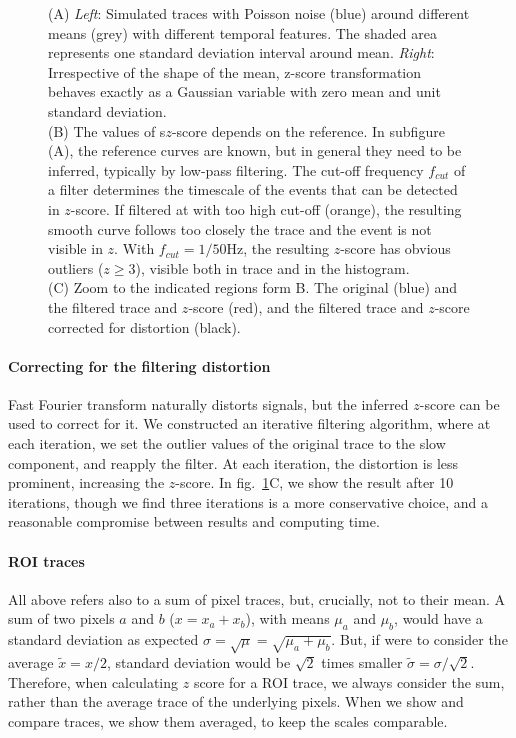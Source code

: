 \documentclass[a4paper,11pt,oneside]{article}
\begin{document}
\begin{figure}[t]
\begin{minipage}{.49\textwidth}
    \end{minipage}
    \caption{
    (A) \emph{Left}: Simulated traces with Poisson noise (blue) around different means (grey) with different temporal features. The shaded area represents one standard deviation interval around mean. 
    \emph{Right}: Irrespective of the shape of the mean, z-score transformation behaves exactly as a Gaussian variable with zero mean and unit standard deviation.\\
    (B) The values of s$z$-score depends on the reference. In subfigure (A), the reference curves are known, but in general they need to be inferred, typically by low-pass filtering. The cut-off frequency $f_{cut}$ of a filter determines the timescale of the events that can be detected in $z$-score. If filtered at with too high cut-off (orange), the resulting smooth curve follows too closely the trace and the event is not visible in $z$. With $f_{cut}=1/50$Hz, the resulting $z$-score has obvious outliers ($z\geq 3$), visible both in trace and in the histogram.\\
    (C) Zoom to the indicated regions form B. The original (blue) and the filtered trace and $z$-score (red), and the filtered trace and $z$-score corrected for distortion (black).
    \label{fig:z_score}
    }
\end{figure}


\paragraph{Correcting for the filtering distortion} 
Fast Fourier transform naturally distorts signals, but the inferred $z$-score can be used to correct for it. We constructed an iterative filtering algorithm, where at each iteration, we set the outlier values of the original trace to the slow component, and reapply the filter. At each iteration, the distortion is less prominent, increasing the $z$-score.
In fig.~\ref{fig:z_score}C, we show the result after 10 iterations, though we find three iterations is a more conservative choice, and a reasonable compromise between results and computing time.


\paragraph{ROI traces}
All above refers also to a sum of pixel traces, but, crucially, not to their mean. A sum of two pixels $a$ and $b$ ($x=x_a+x_b$), with means $\mu_a$ and $\mu_b$, would have a standard deviation as expected $\sigma = \sqrt{\mu} = \sqrt{\mu_a+\mu_b}$. But, if were to consider the average $\tilde x = x/2$, standard deviation would be $\sqrt{2}$ times smaller $\tilde \sigma = \sigma/\sqrt{2}$.
Therefore, when calculating $z$ score for a ROI trace, we always consider the sum, rather than the average trace of the underlying pixels. When we show and compare traces, we show them averaged, to keep the scales comparable.
\end{document}
